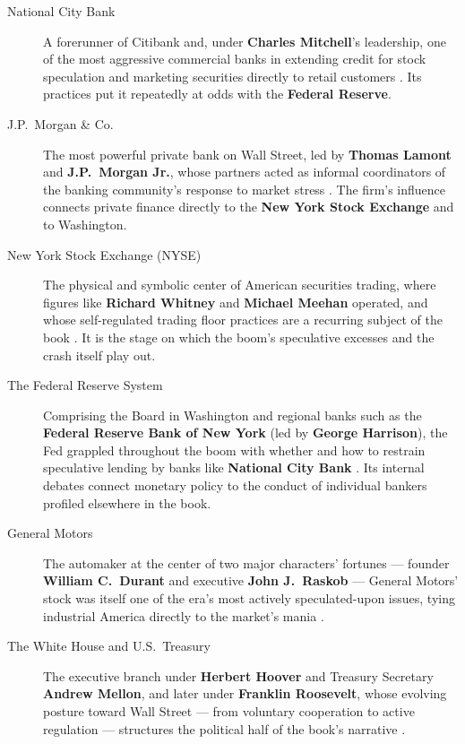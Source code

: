\documentclass[11pt]{article}
\newcommand{\charname}[1]{\textbf{#1}}
\begin{document}
\begin{description}

\item[National City Bank] A forerunner of Citibank and, under
\charname{Charles Mitchell}'s leadership, one of the most aggressive
commercial banks in extending credit for stock speculation and marketing
securities directly to retail customers \autocite{airmail1929,
supersummary1929}. Its practices put it repeatedly at odds with the
\charname{Federal Reserve}.

\item[J.P.\ Morgan \& Co.] The most powerful private bank on Wall Street, led
by \charname{Thomas Lamont} and \charname{J.P.\ Morgan Jr.}, whose partners
acted as informal coordinators of the banking community's response to market
stress \autocite{supersummary1929}. The firm's influence connects private
finance directly to the \charname{New York Stock Exchange} and to Washington.

\item[New York Stock Exchange (NYSE)] The physical and symbolic center of
American securities trading, where figures like \charname{Richard Whitney}
and \charname{Michael Meehan} operated, and whose self-regulated trading
floor practices are a recurring subject of the book
\autocite{supersummary1929}. It is the stage on which the boom's speculative
excesses and the crash itself play out.

\item[The Federal Reserve System] Comprising the Board in Washington and
regional banks such as the \charname{Federal Reserve Bank of New York} (led
by \charname{George Harrison}), the Fed grappled throughout the boom with
whether and how to restrain speculative lending by banks like
\charname{National City Bank} \autocite{supersummary1929}. Its internal
debates connect monetary policy to the conduct of individual bankers profiled
elsewhere in the book.

\item[General Motors] The automaker at the center of two major characters'
fortunes --- founder \charname{William C.\ Durant} and executive
\charname{John J.\ Raskob} --- General Motors' stock was itself one of the
era's most actively speculated-upon issues, tying industrial America
directly to the market's mania \autocite{supersummary1929}.

\item[The White House and U.S.\ Treasury] The executive branch under
\charname{Herbert Hoover} and Treasury Secretary \charname{Andrew Mellon},
and later under \charname{Franklin Roosevelt}, whose evolving posture toward
Wall Street --- from voluntary cooperation to active regulation --- structures
the political half of the book's narrative \autocite{supersummary1929,
csmonitor1929}.


\end{description}
\end{document}
